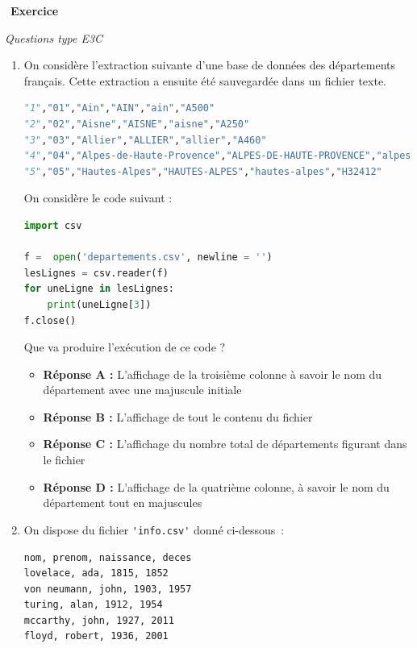 \documentclass[
  11pt,
]{article}
\newcommand{\passthrough}[1]{#1}
\providecommand{\tightlist}{%
  \setlength{\itemsep}{0pt}\setlength{\parskip}{0pt}}
\newcounter{exo}
\newenvironment{exercice}[1]
{\par \medskip   \addtocounter{exo}{1} \noindent  
\begin{bclogo}[arrondi =0.1,   noborder = true, logo=\bccrayon, marge=4]{~\textbf{Exercice} \textbf{\theexo} {\itshape #1} }  \par}
{
\end{bclogo}
 \par \bigskip }
\newcounter{def}
\begin{document}
\begin{exercice}{}

\emph{Questions type E3C}

\begin{enumerate}
\def\labelenumi{\arabic{enumi}.}
\item
  On considère l'extraction suivante d'une base de données des
  départements français. Cette extraction a ensuite été sauvegardée dans
  un fichier texte.

\begin{lstlisting}[language=Python]
"1","01","Ain","AIN","ain","A500"
"2","02","Aisne","AISNE","aisne","A250"
"3","03","Allier","ALLIER","allier","A460"
"4","04","Alpes-de-Haute-Provence","ALPES-DE-HAUTE-PROVENCE","alpes-de-haute-provence","A412316152"
"5","05","Hautes-Alpes","HAUTES-ALPES","hautes-alpes","H32412"
\end{lstlisting}

  On considère le code suivant :

\begin{lstlisting}[language=Python]
import csv

f =  open('departements.csv', newline = '')
lesLignes = csv.reader(f)
for uneLigne in lesLignes:
    print(uneLigne[3])
f.close()
\end{lstlisting}

  Que va produire l'exécution de ce code ?

  \begin{itemize}
  \tightlist
  \item
    \textbf{Réponse A :} L'affichage de la troisième colonne à savoir le
    nom du département avec une majuscule initiale
  \item
    \textbf{Réponse B :} L'affichage de tout le contenu du fichier
  \item
    \textbf{Réponse C :} L'affichage du nombre total de départements
    figurant dans le fichier
  \item
    \textbf{Réponse D :} L'affichage de la quatrième colonne, à savoir
    le nom du département tout en majuscules
  \end{itemize}
\item
  On dispose du fichier \passthrough{\lstinline!'info.csv'!} donné
  ci-dessous~:

\begin{lstlisting}
nom, prenom, naissance, deces
lovelace, ada, 1815, 1852
von neumann, john, 1903, 1957
turing, alan, 1912, 1954
mccarthy, john, 1927, 2011
floyd, robert, 1936, 2001
\end{lstlisting}


\end{enumerate}
\end{exercice}
\end{document}
